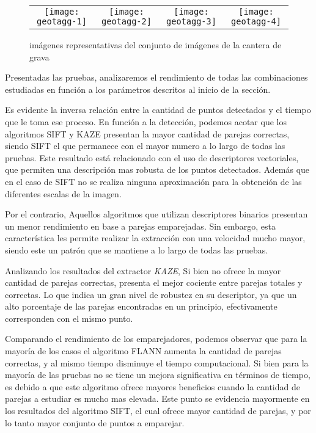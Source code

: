 \begin{figure}[h]
	\centering
	\begin{tabular}{@{}cccc@{}}
		\texttt{[image: geotagg-1]} &
		\texttt{[image: geotagg-2]} &
		\texttt{[image: geotagg-3]} &
		\texttt{[image: geotagg-4]} 
	\end{tabular}
	\caption{imágenes representativas del conjunto de imágenes de la cantera de grava}
	\label{imagen:geotag}
\end{figure}

Presentadas las pruebas, analizaremos el rendimiento de todas las combinaciones estudiadas en función a los parámetros descritos al inicio de la sección.

Es evidente la inversa relación entre la cantidad de puntos detectados y el tiempo que le toma ese proceso. En función a la detección, podemos acotar que los algoritmos SIFT y KAZE presentan la mayor cantidad de parejas correctas, siendo SIFT el que permanece con el mayor numero a lo largo de todas las pruebas. Este resultado está relacionado con el uso de descriptores vectoriales, que permiten una descripción mas robusta de los puntos detectados. Además que en el caso de SIFT no se realiza ninguna aproximación para la obtención de las diferentes escalas de la imagen.

Por el contrario, Aquellos algoritmos que utilizan descriptores binarios presentan un menor rendimiento en base a parejas emparejadas. Sin embargo, esta característica les permite realizar la extracción con una velocidad mucho mayor, siendo este un patrón que se mantiene a lo largo de todas las pruebas.

Analizando los resultados del extractor \textit{KAZE}, Si bien no ofrece la mayor cantidad de parejas correctas, presenta el mejor cociente entre parejas totales y correctas. Lo que indica un gran nivel de robustez en su descriptor, ya que un alto porcentaje de las parejas encontradas en un principio, efectivamente corresponden con el mismo punto.

Comparando el rendimiento de los emparejadores, podemos observar que para la mayoría de los casos el algoritmo FLANN aumenta la cantidad de parejas correctas, y al mismo tiempo disminuye el tiempo computacional. Si bien para la mayoría de las pruebas no se tiene un mejora significativa en términos de tiempo, es debido a que este algoritmo ofrece mayores beneficios cuando la cantidad de parejas a estudiar es mucho mas elevada. Este punto se evidencia mayormente en los resultados del algoritmo SIFT, el cual ofrece mayor cantidad de parejas, y por lo tanto mayor conjunto de puntos a emparejar.

